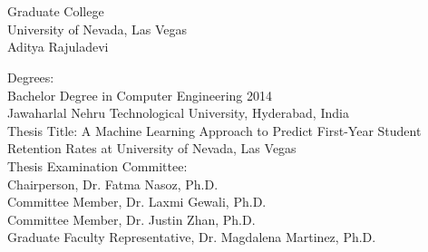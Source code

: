 \documentclass[11pt,openright]{report}
\begin{document}



\vita
\chapter{} %
\linespread{1.3} 
\begin{center}
Graduate College\\
University of Nevada, Las Vegas\\[1cm]
Aditya Rajuladevi\\[1cm]
\end{center}

\noindent Degrees:\\
\indent Bachelor Degree in Computer Engineering 2014\\
\indent Jawaharlal Nehru Technological University, Hyderabad, India\\

\noindent Thesis Title: A Machine Learning Approach to Predict First-Year Student Retention Rates at University of Nevada, Las Vegas\\

\noindent Thesis Examination Committee:\\
\indent Chairperson, Dr. Fatma Nasoz, Ph.D.\\
\indent Committee Member, Dr. Laxmi Gewali, Ph.D.\\
\indent Committee Member, Dr. Justin Zhan, Ph.D.\\
\indent Graduate Faculty Representative, Dr. Magdalena Martinez, Ph.D.\\
\end{document}
